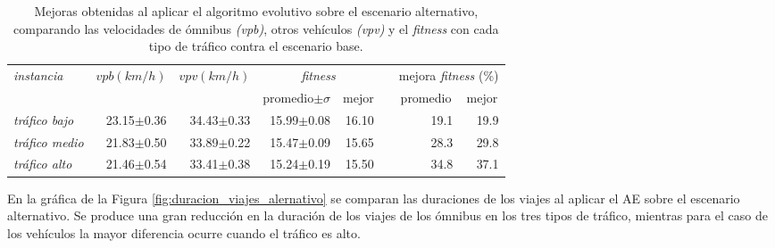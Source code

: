 \begin{table}[h]
	\renewcommand{\arraystretch}{1.2}
	\caption[Valores numéricos al aplicar el AE sobre el escenario alternativo.]{Mejoras obtenidas al aplicar el algoritmo evolutivo sobre el escenario alternativo, comparando las velocidades de ómnibus \textit{(vpb)}, otros vehículos \textit{(vpv)} y el \emph{fitness} con cada tipo de tráfico contra el escenario base.}
	\label{table:mejoras_trafico_alternativo_algoritmo}
	\centering
	\begin{tabular}{lrrrrrrr}
		\hline 
		\textit{instancia}& 
		\textit{$vpb(km/h)$}& 
		\textit{$vpv(km/h)$}&
		\multicolumn{2}{c}{\emph{fitness}}&  & 
		\multicolumn{2}{c}{mejora \emph{fitness} (\%)}\\  \cline{4-5} \cline{7-8}&     &     & \multicolumn{1}{c}{promedio$\pm\sigma$} & \multicolumn{1}{c}{mejor} &  & \multicolumn{1}{c}{promedio} & \multicolumn{1}{c}{mejor} \\ \hline

	\textit{tráfico bajo} & 23.15$\pm$0.36 & 34.43$\pm$0.33 & 15.99$\pm$0.08 & 16.10 & & 19.1& 19.9 \\
		\textit{tráfico medio} & 21.83$\pm$0.50  & 33.89$\pm$0.22 & 15.47$\pm$0.09& 15.65 & & 28.3 & 29.8\\
		\textit{tráfico alto} & 21.46$\pm$0.54  & 33.41$\pm$0.38 & 15.24$\pm$0.19& 15.50 & & 34.8 & 37.1\\	
		\hline		    
	\end{tabular}
\end{table}

En la gráfica de la Figura \ref{fig:duracion_viajes_alernativo} se comparan las duraciones de los viajes al aplicar el AE sobre el escenario alternativo. Se produce una gran reducción en la duración de los viajes de los ómnibus en los tres tipos de tráfico, mientras para el caso de los vehículos la mayor diferencia ocurre cuando el tráfico es alto.


